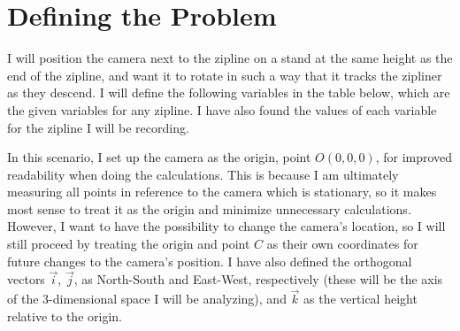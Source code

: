 \documentclass[12pt]{article}
\begin{document}
\section{Defining the Problem}

I will position the camera next to the zipline on a stand at the same height as the end of the zipline, and want it to rotate in such a way that it tracks the zipliner as they descend. I will define the following variables in the table below, which are the given variables for any zipline. I have also found the values of each variable for the zipline I will be recording. 


In this scenario, I set up the camera as the origin, point $O(0,0,0)$, for improved readability when doing the calculations. This is because I am ultimately measuring all points in reference to the camera which is stationary, so it makes most sense to treat it as the origin and minimize unnecessary calculations. However, I want to have the possibility to change the camera's location, so I will still proceed by treating the origin and point $C$ as their own coordinates for future changes to the camera's position. I have also defined the orthogonal vectors $\vec i$, $\vec j$, as North-South and East-West, respectively (these will be the axis of the 3-dimensional space I will be analyzing), and $\vec k$ as the vertical height relative to the origin.

\end{document}
